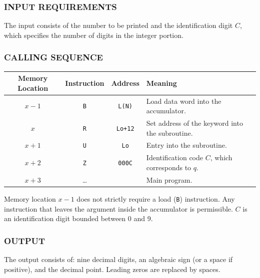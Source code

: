 \subsubsection*{INPUT REQUIREMENTS}
The input consists of the number to be printed and the identification digit $C$, which specifies the number of digits in the integer portion.

\subsubsection*{CALLING SEQUENCE}
\begin{table}[h!]
\centering
\begin{tabularx}{\textwidth}{cccX}
\toprule
\textbf{Memory Location} & \textbf{Instruction} & \textbf{Address} & \textbf{Meaning} \\
\midrule
$x-1$             & \texttt{B}      & \texttt{L(N)}    & Load data word into the accumulator. \\
$x$               & \texttt{R}      & \texttt{Lo+12}   & Set address of the keyword into the subroutine. \\
$x+1$             & \texttt{U}      & \texttt{Lo}      & Entry into the subroutine. \\
$x+2$             & \texttt{Z}      & \texttt{000C}    & Identification code $C$, which corresponds to $q$. \\
$x+3$             & \dots           &                  & Main program. \\
\bottomrule
\end{tabularx}
\end{table}
Memory location $x-1$ does not strictly require a load (\texttt{B}) instruction. Any instruction that leaves the argument inside the accumulator is permissible. $C$ is an identification digit bounded between 0 and 9.

\subsubsection*{OUTPUT}
The output consists of: nine decimal digits, an algebraic sign (or a space if positive), and the decimal point. Leading zeros are replaced by spaces.

